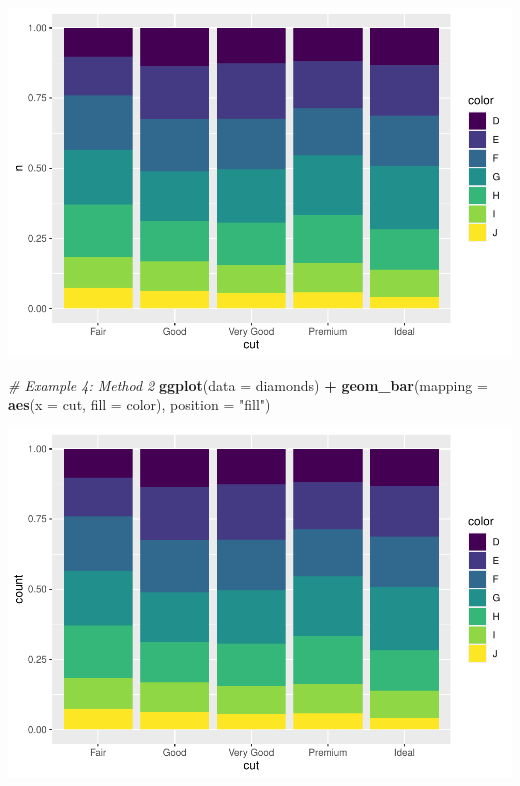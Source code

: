 \documentclass[
]{book}
\newenvironment{Shaded}{\begin{snugshade}}{\end{snugshade}}
\newcommand{\CommentTok}[1]{\textcolor[rgb]{0.56,0.35,0.01}{\textit{#1}}}
\newcommand{\DataTypeTok}[1]{\textcolor[rgb]{0.13,0.29,0.53}{#1}}
\newcommand{\KeywordTok}[1]{\textcolor[rgb]{0.13,0.29,0.53}{\textbf{#1}}}
\newcommand{\NormalTok}[1]{#1}
\newcommand{\OperatorTok}[1]{\textcolor[rgb]{0.81,0.36,0.00}{\textbf{#1}}}
\newcommand{\StringTok}[1]{\textcolor[rgb]{0.31,0.60,0.02}{#1}}
\begin{document}
\includegraphics{_main_files/figure-latex/unnamed-chunk-319-4.pdf}

\begin{Shaded}
\begin{Highlighting}[]
\CommentTok{# Example 4: Method 2}
\KeywordTok{ggplot}\NormalTok{(}\DataTypeTok{data =}\NormalTok{ diamonds) }\OperatorTok{+}\StringTok{ }\KeywordTok{geom_bar}\NormalTok{(}\DataTypeTok{mapping =} \KeywordTok{aes}\NormalTok{(}\DataTypeTok{x =}\NormalTok{ cut, }\DataTypeTok{fill =}\NormalTok{ color),}
    \DataTypeTok{position =} \StringTok{"fill"}\NormalTok{)}
\end{Highlighting}
\end{Shaded}

\includegraphics{_main_files/figure-latex/unnamed-chunk-319-5.pdf}

\begin{Shaded}
\end{Shaded}
\end{document}
